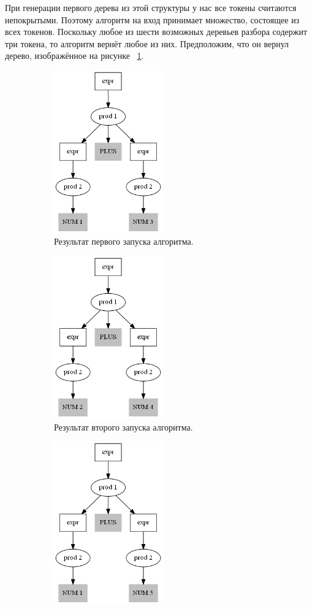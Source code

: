 При генерации первого дерева из этой структуры у нас все токены считаются непокрытыми. Поэтому алгоритм на вход принимает множество, состоящее из всех токенов. Поскольку любое из шести возможных деревьев разбора содержит три токена, то алгоритм вернёт любое из них. Предположим, что он вернул дерево, изображённое на рисунке ~\ref{Illustration_res1}. 

\begin{figure}[h]
    \centering
    \begin{subfigure}{0.25\textwidth}
        \includegraphics[height=70mm]{Pictures/Illustration_res1.png}
        \caption{Результат первого запуска алгоритма.}
        \label{Illustration_res1}
    \end{subfigure}
    \qquad
    \begin{subfigure}[h]{0.25\textwidth}
        \includegraphics[height=70mm]{Pictures/Illustration_res2.png}
        \caption{Результат второго запуска алгоритма.}
        \label{Illustration_res2}
    \end{subfigure}
    \qquad
    \begin{subfigure}[h]{0.25\textwidth}
        \centering
        \includegraphics[height=70mm]{Pictures/Illustration_res3.png}

\end{subfigure}
\end{figure}
